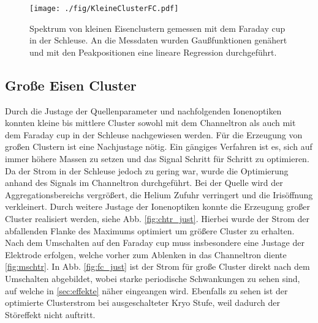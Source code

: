 \begin{figure}
  \centering
  \texttt{[image: ./fig/KleineClusterFC.pdf]}
  \caption{Spektrum von kleinen Eisenclustern gemessen mit dem Faraday cup in der Schleuse. An die Messdaten wurden Gaußfunktionen genähert und mit den Peakpositionen eine lineare Regression durchgeführt.}
  \label{fig:cluster_fc}
\end{figure}


\subsection{Große Eisen Cluster}
Durch die Justage der Quellenparameter und nachfolgenden Ionenoptiken konnten kleine bis mittlere Cluster sowohl mit dem Channeltron als auch mit dem Faraday cup in der Schleuse nachgewiesen werden.
Für die Erzeugung von großen Clustern ist eine Nachjustage nötig.
Ein gängiges Verfahren ist es, sich auf immer höhere Massen zu setzen und das Signal Schritt für Schritt zu optimieren.
Da der Strom in der Schleuse jedoch zu gering war, wurde die Optimierung anhand des Signals im Channeltron durchgeführt.
Bei der Quelle wird der Aggregationsbereichs vergrößert, die Helium Zufuhr verringert und
die Irisöffnung verkleinert.
Durch weitere Justage der Ionenoptiken konnte die Erzeugung großer Cluster realisiert werden, siehe Abb. \ref{fig:chtr_just}.
Hierbei wurde der Strom der abfallenden Flanke des Maximums optimiert um größere Cluster zu erhalten.
Nach dem Umschalten auf den Faraday cup muss insbesondere eine Justage der Elektrode erfolgen, welche vorher zum Ablenken in das Channeltron diente \ref{fig:mschtr}.
In Abb. \ref{fig:fc_just} ist der Strom für große Cluster direkt nach dem Umschalten abgebildet, wobei starke periodische Schwankungen zu sehen sind, auf welche in \ref{sec:effekte} näher eingeangen wird.
Ebenfalls zu sehen ist der optimierte Clusterstrom bei ausgeschalteter Kryo Stufe, weil dadurch der Störeffekt nicht auftritt.


